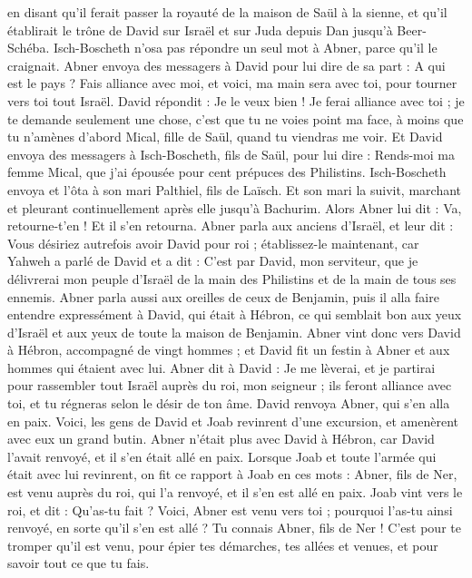 \begin{multicols}{2}
en disant qu'il ferait passer la royauté de la maison de Saül à la sienne, et qu'il établirait le trône de David sur Israël et sur Juda depuis Dan jusqu'à Beer-Schéba.
Isch-Boscheth n'osa pas répondre un seul mot à Abner, parce qu'il le craignait.
Abner envoya des messagers à David pour lui dire de sa part : A qui est le pays ? Fais alliance avec moi, et voici, ma main sera avec toi, pour tourner vers toi tout Israël.
David répondit : Je le veux bien ! Je ferai alliance avec toi ; je te demande seulement une chose, c'est que tu ne voies point ma face, à moins que tu n'amènes d'abord Mical, fille de Saül, quand tu viendras me voir.
Et David envoya des messagers à Isch-Boscheth, fils de Saül, pour lui dire : Rends-moi ma femme Mical, que j'ai épousée pour cent prépuces des Philistins.
Isch-Boscheth envoya et l'ôta à son mari Palthiel, fils de Laïsch.
Et son mari la suivit, marchant et pleurant continuellement après elle jusqu'à Bachurim. Alors Abner lui dit : Va, retourne-t'en ! Et il s'en retourna.
Abner parla aux anciens d'Israël, et leur dit : Vous désiriez autrefois avoir David pour roi ;
établissez-le maintenant, car Yahweh a parlé de David et a dit : C'est par David, mon serviteur, que je délivrerai mon peuple d'Israël de la main des Philistins et de la main de tous ses ennemis.
Abner parla aussi aux oreilles de ceux de Benjamin, puis il alla faire entendre expressément à David, qui était à Hébron, ce qui semblait bon aux yeux d'Israël et aux yeux de toute la maison de Benjamin.
Abner vint donc vers David à Hébron, accompagné de vingt hommes ; et David fit un festin à Abner et aux hommes qui étaient avec lui.
Abner dit à David : Je me lèverai, et je partirai pour rassembler tout Israël auprès du roi, mon seigneur ; ils feront alliance avec toi, et tu régneras selon le désir de ton âme. David renvoya Abner, qui s'en alla en paix.
Voici, les gens de David et Joab revinrent d'une excursion, et amenèrent avec eux un grand butin. Abner n'était plus avec David à Hébron, car David l'avait renvoyé, et il s'en était allé en paix.
Lorsque Joab et toute l'armée qui était avec lui revinrent, on fit ce rapport à Joab en ces mots : Abner, fils de Ner, est venu auprès du roi, qui l'a renvoyé, et il s'en est allé en paix.
Joab vint vers le roi, et dit : Qu'as-tu fait ? Voici, Abner est venu vers toi ; pourquoi l'as-tu ainsi renvoyé, en sorte qu'il s'en est allé ?
Tu connais Abner, fils de Ner ! C'est pour te tromper qu'il est venu, pour épier tes démarches, tes allées et venues, et pour savoir tout ce que tu fais.

\end{multicols}
